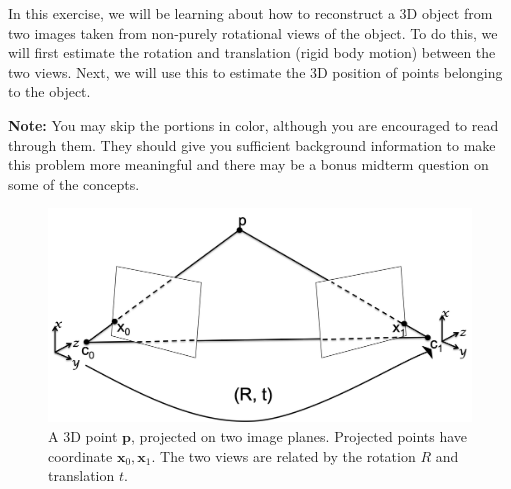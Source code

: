 \newline
In this exercise, we will be learning about how to reconstruct a 3D object from two images taken from non-purely rotational views of the object. To do this, we will first estimate the rotation and translation (rigid body motion) between the two views. Next, we will use this to estimate the 3D position of points belonging to the object. 

\textbf{Note:} You may skip the portions in color, although you are encouraged to read through them. They should give you sufficient background information to make this problem more meaningful and there may be a bonus midterm question on some of the concepts.
\begin{figure}[!ht]
    \centering
    \includegraphics[width=\linewidth]{figures/two_view_camera_setup.png}
    \caption{A 3D point $\mathbf{p}$, projected on two image planes. Projected points have coordinate $\mathbf{x}_{0}, \mathbf{x}_{1}$. The two views are related by the rotation $R$ and translation $t$. }
    \label{fig:two_view_image}
\end{figure}
\newline

